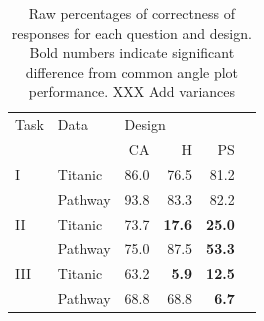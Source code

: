 \begin{table}[ht]
\begin{center}
\begin{tabular}{llrrrr}
  \hline
Task & Data & \multicolumn{3}{l}{Design} \\
& & CA & H & PS \\ 
  \hline
 I & Titanic & 86.0 & 76.5 & 81.2 \\ 
 & Pathway & 93.8 & 83.3 & 82.2 \\ [3pt]
 II & Titanic  & 73.7 & {\bf 17.6} & {\bf 25.0} \\ 
 & Pathway  & 75.0 & 87.5 & {\bf 53.3} \\
 III & Titanic  & 63.2 & {\bf 5.9} & {\bf 12.5} \\ 
 & Pathway  & 68.8 & 68.8 & {\bf 6.7} \\ [3pt]
   \hline
\end{tabular}
\end{center}
\caption{\label{raw} Raw percentages of correctness of responses for each question and design. Bold numbers indicate significant difference from common angle plot performance. XXX Add variances }
\end{table}


